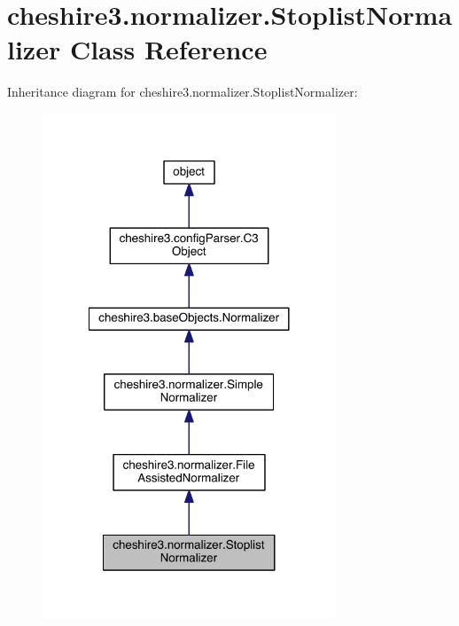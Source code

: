 \hypertarget{classcheshire3_1_1normalizer_1_1_stoplist_normalizer}{\section{cheshire3.\-normalizer.\-Stoplist\-Normalizer Class Reference}
\label{classcheshire3_1_1normalizer_1_1_stoplist_normalizer}
}


Inheritance diagram for cheshire3.\-normalizer.\-Stoplist\-Normalizer\-:
\nopagebreak
\begin{figure}[H]
\begin{center}
\leavevmode
\includegraphics[width=248pt]{classcheshire3_1_1normalizer_1_1_stoplist_normalizer__inherit__graph}
\end{center}
\end{figure}



